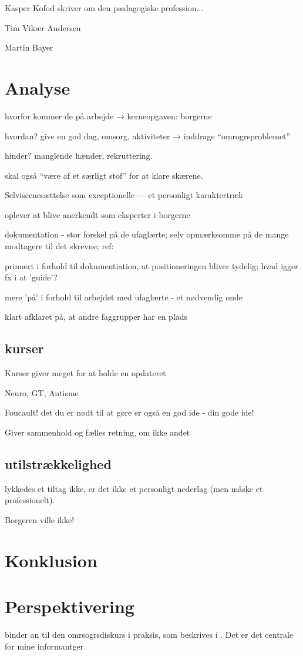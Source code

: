 Kasper Kofod skriver om den pædagogiske profession...

Tim Vikær Andersen

Martin Bayer

\section{Analyse}
hvorfor kommer de på arbejde → kerneopgaven: borgerne

hvordan? give en god dag, omsorg, aktiviteter → inddrage “omrogrsproblemet” \autocite[s.455ff]{hansbolKonstruktionAfProfessionel2008}

hinder? manglende hænder, rekruttering.

skal også “være af et særligt stof” for at klare skærene.

Selviscenesættelse som exceptionelle --- et personligt karaktertræk

oplever at blive anerkendt som eksperter i borgerne

dokumentation - stor forskel på de ufaglærte; selv opmærksomme på de mange modtagere til det skrevne; ref: \autocite{hjerrildNarViSkriver2017, andersenUndervisningInstitutionOg2019}

primært i forhold til dokumentiation, at positioneringen bliver tydelig; hvad igger fx i at 'guide'?

mere 'på' i forhold til arbejdet med ufaglærte - et nødvendig onde

klart afklaret på, at andre faggrupper har en plads

\subsection{kurser}
Kurser giver meget for at holde en opdateret

Neuro, GT, Autisme

Foucault! det du er nødt til at gøre er også en god ide - din gode ide!

Giver sammenhold og fælles retning, om ikke andet

\subsection{utilstrækkelighed}
lykkedes et tiltag ikke, er det ikke et personligt nederlag (men måske et professionelt).

Borgeren ville ikke!

\section{Konklusion}

\section{Perspektivering}
binder an til den omrsogrsdiskurs i praksis, som beskrives i . Det er det centrale for mine informantger
